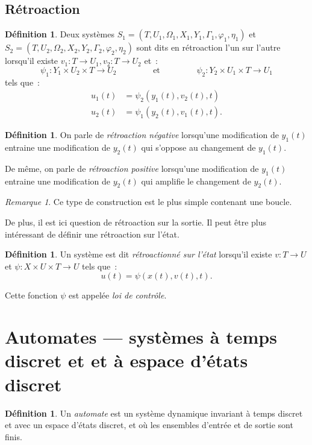 \documentclass{article}
\theoremstyle{definition}
\newtheorem{déf}[thm]{Définition}
\theoremstyle{remark}
\newtheorem*{rmq}{Remarque}
\begin{document}
	\subsection{Rétroaction}

	\begin{déf} Deux systèmes $S_1 = (T, U_1, \Omega_1, X_1, Y_1, \Gamma_1, \varphi_1, \eta_1)$ et $S_2 = (T, U_2, \Omega_2, X_2, Y_2, \Gamma_2, \varphi_2, \eta_2)$
	sont dits en rétroaction l'un sur l'autre lorsqu'il existe $v_1 : T \to U_1, v_2 : T \to U_2$ et~:
	\[\psi_1 : Y_1 \times U_2 \times T \to U_2 \qquad\qquad \text{ et } \qquad\qquad \psi_2 : Y_2 \times U_1 \times T \to U_1\]
	tels que~:
	\begin{align*}
		u_1(t) &= \psi_2\left(y_1(t), v_2(t), t\right) \\
		u_2(t) &= \psi_1\left(y_2(t), v_1(t), t\right).
	\end{align*}
	\end{déf}

	\begin{déf} On parle de \textit{rétroaction négative} lorsqu'une modification de $y_1(t)$ entraine une modification de $y_2(t)$ qui s'oppose au changement
	de $y_1(t)$.

	De même, on parle de \textit{rétroaction positive} lorsqu'une modification de $y_1(t)$ entraine une modification de $y_2(t)$ qui amplifie le changement de
	$y_2(t)$.
	\end{déf}

	\begin{rmq} Ce type de construction est le plus simple contenant une boucle.

	De plus, il est ici question de rétroaction sur la sortie. Il peut être plus intéressant de définir une rétroaction sur l'état.
	\end{rmq}

	\begin{déf} Un système est dit \textit{rétroactionné sur l'état} lorsqu'il existe $v : T \to U$ et $\psi : X \times U \times T \to U$ tels que~:
	\[u(t) = \psi\left(x(t), v(t), t\right).\]

	Cette fonction $\psi$ est appelée \textit{loi de contrôle}.
	\end{déf}

\section{Automates --- systèmes à temps discret et et à espace d'états discret}
	\begin{déf} Un \textit{automate} est un système dynamique invariant à temps discret et avec un espace d'états discret, et où les ensembles d'entrée et de
	sortie sont finis.
	\end{déf}
\end{document}
